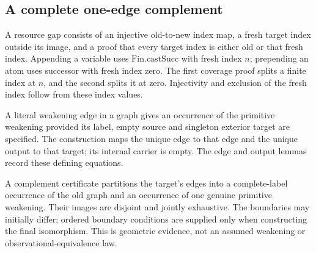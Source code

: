 


\subsection{A complete one-edge complement}

A resource gap consists of an injective old-to-new index map, a fresh target
index outside its image, and a proof that every target index is either old or
that fresh index. Appending a variable uses $\mathrm{Fin.castSucc}$ with fresh
index $n$; prepending an atom uses successor with fresh index zero. The first
coverage proof splits a finite index at $n$, and the second splits it at zero.
Injectivity and exclusion of the fresh index follow from these index values.




A literal weakening edge in a graph gives an occurrence of the primitive
weakening provided its label, empty source and singleton exterior target are
specified. The construction maps the unique edge to that edge and the unique
output to that target; its internal carrier is empty. The edge and output
lemmas record these defining equations.




A complement certificate partitions the target's edges into a complete-label
occurrence of the old graph and an occurrence of one genuine primitive
weakening. Their images are disjoint and jointly exhaustive. The boundaries
may initially differ; ordered boundary conditions are supplied only when
constructing the final isomorphism. This is geometric evidence, not an assumed
weakening or observational-equivalence law.

